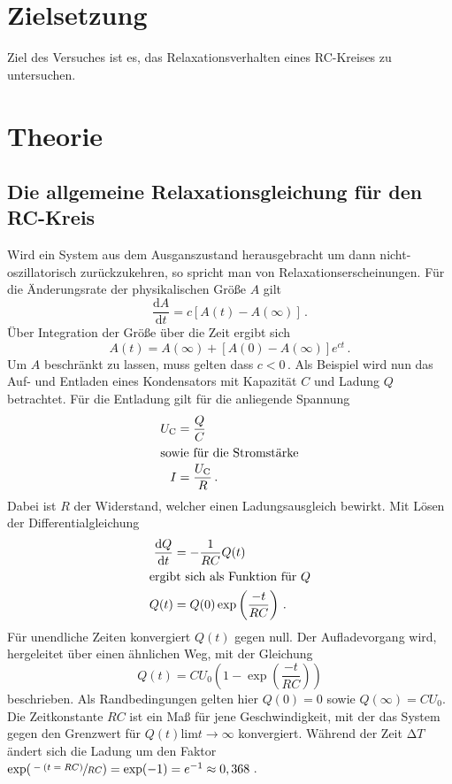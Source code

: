 \section{Zielsetzung}
Ziel des Versuches ist es, das Relaxationsverhalten eines RC-Kreises zu untersuchen.

\section{Theorie}
\label{sec:Theorie}
\subsection{Die allgemeine Relaxationsgleichung für den RC-Kreis}
Wird ein System aus dem Ausganszustand herausgebracht um dann 
nicht-oszillatorisch zurückzukehren, so spricht man von Relaxationserscheinungen.
Für die Änderungsrate der physikalischen Größe $A$ gilt 
\begin{equation}
    \frac{\text{d}A}{\text{d}t}=c[A(t)-A(\infty)]\,.
\end{equation}
Über Integration der Größe über die Zeit ergibt sich 
\begin{equation}
    A(t)=A(\infty)+[A(0)-A(\infty)]e^{ct}\,.
\end{equation}
Um $A$ beschränkt zu lassen, muss gelten dass $c<0$\,.
Als Beispiel wird nun das Auf- und Entladen eines Kondensators
mit Kapazität $C$ und Ladung $Q$ betrachtet.
Für die Entladung gilt für die anliegende Spannung 
\begin{align}
    U_\text{C}&=\frac{Q}{C}\\
    \intertext{sowie für die Stromstärke}
    I&=\frac{U_\text{C}}{R}\,.
\end{align}
Dabei ist $R$ der Widerstand, welcher einen Ladungsausgleich bewirkt.
Mit Lösen der Differentialgleichung 
\begin{align}
    \frac{\text{d}Q}{\text{d}t}&=-\frac{1}{RC}Q(t)\\
    \intertext{ergibt sich als Funktion für $Q$}
    Q(t)&=Q(0)\exp\left(\frac{-t}{RC}\right)\,.
\end{align}
Für unendliche Zeiten konvergiert $Q(t)$ gegen null.
Der Aufladevorgang wird, hergeleitet über einen ähnlichen Weg,
mit der Gleichung 
\begin{equation}
    Q(t)=CU_0(1-\exp\left(\frac{-t}{RC}\right))
\end{equation}
beschrieben.
Als Randbedingungen gelten hier $Q(0)=0$ sowie $Q(\infty)=CU_0$.
Die Zeitkonstante $RC$ ist ein Maß für jene Geschwindigkeit, mit der 
das System gegen den Grenzwert für $Q(t)\text{lim}t\rightarrow\infty$
konvergiert. Während der Zeit $\increment T$ ändert sich die Ladung um 
den Faktor $\exp(\sfrac{-(t=RC)}{RC})=\exp(-1)=e^{-1}\approx0,368$\,. 
